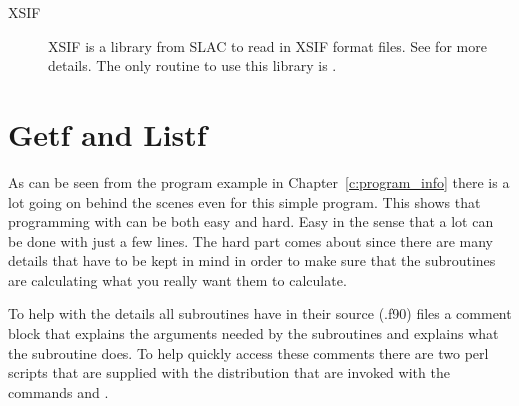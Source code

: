 \begin{description}
\item[XSIF] 
XSIF is a library from SLAC to read in XSIF format files. See 
 for more details. The only
\bmad routine to use this library is .

\end{description}

\section{Getf and Listf}
\label{s:getf}

As can be seen from the program example in Chapter~\ref{c:program_info}
there is a lot going on behind the scenes even for this
simple program. This shows that programming with \bmad can be both easy
and hard. Easy in the sense that a lot can be done with just a few
lines. The hard part comes about since there are many details that
have to be kept in mind in order to make sure that the subroutines
are calculating what you really want them to calculate.

To help with the details all \bmad subroutines have in their source (.f90)
files a comment block that explains the arguments needed by the
subroutines and explains what the subroutine does. To help quickly
access these comments there are two perl scripts that are supplied
with the \bmad distribution that are invoked with the commands
 and .


